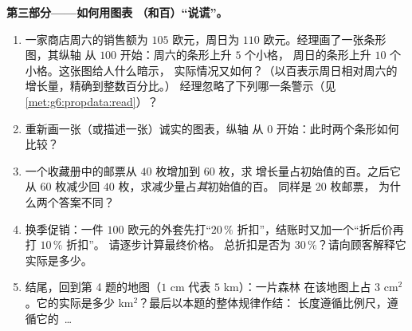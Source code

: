 \begin{problem}
\medskip
\noindent\textbf{第三部分——如何用图表
（和百）“说谎”。}
\begin{enumerate}[resume]
  \item 一家商店周六的销售额为 $105$ 欧元，周日为 $110$
        欧元。经理画了一张条形图，其纵轴
        从 $100$ 开始：周六的条形上升 $5$ 个小格，
        周日的条形上升 $10$ 个小格。这张图给人什么暗示，
        实际情况又如何？（以百表示周日相对周六的
        增长量，精确到整数百分比。）
        经理忽略了下列哪一条警示（见
        \cref{met:g6:propdata:read}）？
  \item 重新画一张（或描述一张）诚实的图表，纵轴
        从 $0$ 开始：此时两个条形如何比较？
  \item 一个收藏册中的邮票从 $40$ 枚增加到 $60$ 枚，求
        增长量占初始值的百。之后它从 $60$ 枚减少回
        $40$ 枚，求减少量占\emph{其}初始值的百。
        同样是 $20$ 枚邮票，
        为什么两个答案不同？
  \item 换季促销：一件 $100$ 欧元的外套先打“$20\,\%$
        折扣”，结账时又加一个“折后价再打 $10\,\%$ 折扣”。
        请逐步计算最终价格。
        总折扣是否为 $30\,\%$？请向顾客解释它
        实际是多少。
  \item 结尾，回到第 4 题的地图（$1$ cm 代表 $5$ km）：一片森林
        在该地图上占 $3$ cm$^2$。它的实际是多少
        km$^2$？最后以本题的整体规律作结：
        长度遵循比例尺，遵循它的
        \,\dots
\end{enumerate}
\end{problem}
